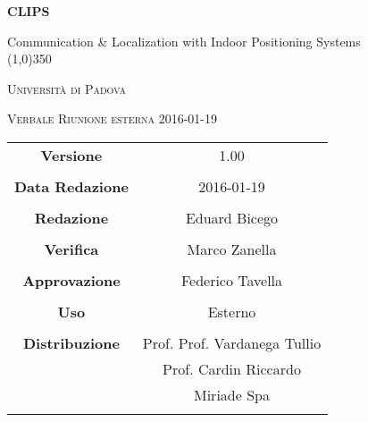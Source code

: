 \documentclass[a4paper,12pt]{article}
\author{Eduard Bicego}
\date{19/01/2016}
\begin{document}
\begin{titlepage}
	\centering
	{\huge\bfseries CLIPS\par}
	Communication \& Localization with Indoor Positioning Systems \\
	\line(1,0){350} \\
	{\scshape\LARGE Università di Padova \par}
	\vspace{1cm}
	{\scshape\Large Verbale Riunione esterna 2016-01-19 \par}
	\logo
	\newpage
	\begin{tabular}{c|c}
		{\hfill \textbf{Versione}} 			& 1.00				\\ \\
		{\hfill\textbf{Data Redazione}} 	& 2016-01-19  		\\ \\
		{\hfill\textbf{Redazione}} 			& Eduard Bicego		\\ \\
		{\hfill\textbf{Verifica}} 			& Marco Zanella		\\ \\
		{\hfill\textbf{Approvazione}} 		& Federico Tavella	\\ \\
		{\hfill\textbf{Uso}} 				& Esterno			\\ \\
		{\hfill\textbf{Distribuzione}} 		& Prof. Prof. Vardanega Tullio \\
											& Prof. Cardin Riccardo \\
											& Miriade Spa \\ \\
	\end{tabular}
\end{titlepage}
	
	\newpage

	
	\label{LastFrontPage}
	

	\newpage
	
	\pagestyle{mymain}
	
	
		

	
		
	
	\newpage
		
	
	\newpage
		
				
	\label{LastPage}
\end{document}
